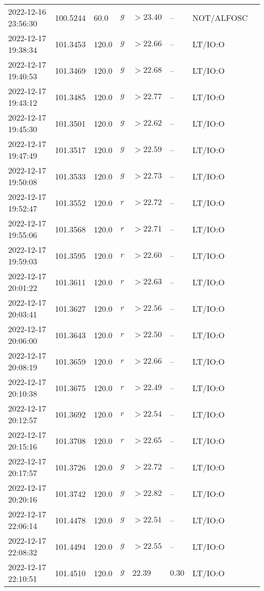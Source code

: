 \documentclass{nature_plusfigure}
\begin{document}
\begin{supplement}
\begin{center}
\begin{longtable}{llllllll}
2022-12-16 23:56:30 & 100.5244 & 60.0 & $g$ & $>23.40$ & -- & NOT/ALFOSC &  \\ 
2022-12-17 19:38:34 & 101.3453 & 120.0 & $g$ & $>22.66$ & -- & LT/IO:O &  \\ 
2022-12-17 19:40:53 & 101.3469 & 120.0 & $g$ & $>22.68$ & -- & LT/IO:O &  \\ 
2022-12-17 19:43:12 & 101.3485 & 120.0 & $g$ & $>22.77$ & -- & LT/IO:O &  \\ 
2022-12-17 19:45:30 & 101.3501 & 120.0 & $g$ & $>22.62$ & -- & LT/IO:O &  \\ 
2022-12-17 19:47:49 & 101.3517 & 120.0 & $g$ & $>22.59$ & -- & LT/IO:O &  \\ 
2022-12-17 19:50:08 & 101.3533 & 120.0 & $g$ & $>22.73$ & -- & LT/IO:O &  \\ 
2022-12-17 19:52:47 & 101.3552 & 120.0 & $r$ & $>22.72$ & -- & LT/IO:O &  \\ 
2022-12-17 19:55:06 & 101.3568 & 120.0 & $r$ & $>22.71$ & -- & LT/IO:O &  \\ 
2022-12-17 19:59:03 & 101.3595 & 120.0 & $r$ & $>22.60$ & -- & LT/IO:O &  \\ 
2022-12-17 20:01:22 & 101.3611 & 120.0 & $r$ & $>22.63$ & -- & LT/IO:O &  \\ 
2022-12-17 20:03:41 & 101.3627 & 120.0 & $r$ & $>22.56$ & -- & LT/IO:O &  \\ 
2022-12-17 20:06:00 & 101.3643 & 120.0 & $r$ & $>22.50$ & -- & LT/IO:O &  \\ 
2022-12-17 20:08:19 & 101.3659 & 120.0 & $r$ & $>22.66$ & -- & LT/IO:O &  \\ 
2022-12-17 20:10:38 & 101.3675 & 120.0 & $r$ & $>22.49$ & -- & LT/IO:O &  \\ 
2022-12-17 20:12:57 & 101.3692 & 120.0 & $r$ & $>22.54$ & -- & LT/IO:O &  \\ 
2022-12-17 20:15:16 & 101.3708 & 120.0 & $r$ & $>22.65$ & -- & LT/IO:O &  \\ 
2022-12-17 20:17:57 & 101.3726 & 120.0 & $g$ & $>22.72$ & -- & LT/IO:O &  \\ 
2022-12-17 20:20:16 & 101.3742 & 120.0 & $g$ & $>22.82$ & -- & LT/IO:O &  \\ 
2022-12-17 22:06:14 & 101.4478 & 120.0 & $g$ & $>22.51$ & -- & LT/IO:O &  \\ 
2022-12-17 22:08:32 & 101.4494 & 120.0 & $g$ & $>22.55$ & -- & LT/IO:O &  \\ 
2022-12-17 22:10:51 & 101.4510 & 120.0 & $g$ & $22.39$ & $0.30$ & LT/IO:O &  \\ 

\end{longtable}
\end{center}
\end{supplement}
\end{document}
